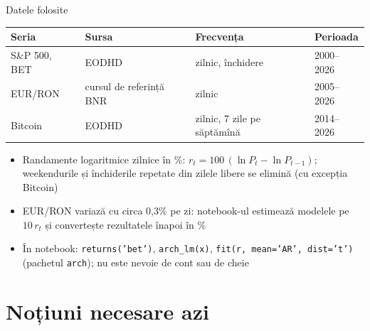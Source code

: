 \begin{frame}{Datele folosite}
\itemsize{\small}
\begin{center}
\footnotesize
\begin{tabular}{llll}
\toprule
\textbf{Seria} & \textbf{Sursa} & \textbf{Frecvența} & \textbf{Perioada} \\
\midrule
S\&P 500, BET & EODHD & zilnic, închidere & 2000--2026 \\
EUR/RON & cursul de referință BNR & zilnic & 2005--2026 \\
Bitcoin & EODHD & zilnic, 7 zile pe săptămînă & 2014--2026 \\
\bottomrule
\end{tabular}
\end{center}
\begin{itemize}
    \item Randamente logaritmice zilnice în \%: $r_t = 100\,(\ln P_t - \ln P_{t-1})$; weekendurile și închiderile repetate din zilele libere se elimină (cu excepția Bitcoin)
    \item EUR/RON variază cu circa 0,3\% pe zi: notebook-ul estimează modelele pe $10\,r_t$ și convertește rezultatele înapoi în \%
    \item În notebook: \texttt{returns('bet')}, \texttt{arch\_lm(x)}, \texttt{fit(r, mean='AR', dist='t')} (pachetul \texttt{arch}); nu este nevoie de cont sau de cheie
\end{itemize}
\end{frame}


\section{Noțiuni necesare azi}

